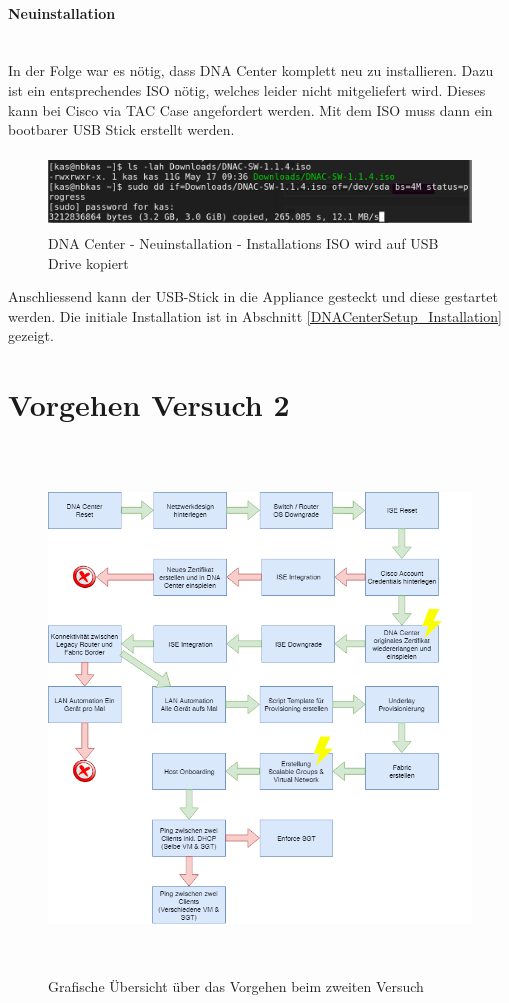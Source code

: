 \paragraph{Neuinstallation} 
~\\
In der Folge war es nötig, dass DNA Center komplett neu zu installieren. Dazu ist ein entsprechendes ISO nötig, welches leider nicht mitgeliefert wird. Dieses kann bei Cisco via TAC Case angefordert werden. Mit dem ISO muss dann ein bootbarer USB Stick erstellt werden.

\begin{figure}[H]
	\centering
	\includegraphics[height=2cm]{img/dna-center-reset-iso.png}
	\caption{DNA Center - Neuinstallation - Installations ISO wird auf USB Drive kopiert}
	\label{fig:dna-center-iso-1}
\end{figure}

Anschliessend kann der USB-Stick in die Appliance gesteckt und diese gestartet werden. Die initiale Installation ist in Abschnitt \ref{DNACenterSetup_Installation} gezeigt. 


\section{Vorgehen Versuch 2}
\begin{figure}[H]
	\centering
	\includegraphics[height=14cm]{img/vorgehen2.png}
	\caption{Grafische Übersicht über das Vorgehen beim zweiten Versuch}
	\label{fig:vorgehen-2}
\end{figure} 

